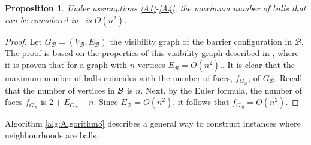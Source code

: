 \documentclass[a4paper,  review, authoryear, 1p.]{elsarticle}
\newcommand{\TSPHN}{{\sf{H-TSPHN}\xspace }}
\newcommand{\VB}{{V^{}_{\mathcal B}}}
\newcommand{\EB}{{E^{}_{\mathcal B}}}
\newtheorem{prop}{Proposition}
\newcommand{\JP}[1]{{\color{armygreen}#1}}
\newcommand{\CV}[1]{{\color{red}#1}}
\begin{document}


\begin{prop}
	Under assumptions \ref{A1}-\ref{A4}, the maximum number of balls that can be considered in \TSPHN \ is $O(n^2)$.
\end{prop}
\begin{proof}
	\CV{Let $G_{\mathcal B}=(\VB, \EB)$ the visibility graph of the barrier configuration in $\mathcal B$. The proof is based on the properties of this visibility graph described in \cite{mitchell2017a}, \JP{where it is proven that for a graph with $n$ vertices $\EB =O(n^2)$.}.  It is clear that the maximum number of balls coincides with the number of faces, $f_{G_{\mathcal B}}$, of $G_{\mathcal B}$.  Recall that the number of vertices in $\cal B$ is $n$. Next, by the Euler formula, the number of faces $f_{G_{\mathcal B}}$ is $2+E_{G_{\mathcal B}}-n$. Since $\EB=O(n^2)$, it follows that $f_{G_{\mathcal B}}=O(n^2)$.}
\end{proof}

Algorithm \ref{alg:Algorithm3} describes a general way to construct instances where neighbourhoods are balls.
\end{document}
